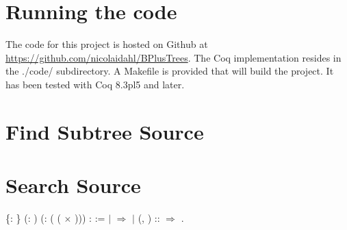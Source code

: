 \appendix
\label{sec:Appendix}
\section{Running the code}
The code for this project is hosted on Github at \url{https://github.com/nicolaidahl/BPlusTrees}. The Coq implementation resides in the ./code/ subdirectory. A Makefile is provided that will build the project. It has been tested with Coq 8.3pl5 and later.

\newpage

\section{Find Subtree Source}
\label{sec:findSubtree}


\section{Search Source}
\label{sec:SearchSource}

\begin{coqdoccode}
  \{: \} (: ) (: ( ( \ensuremath{\times} ))) :   :=\coqdoceol
\coqdocindent{1.00em}
  \coqdoceol
\coqdocindent{2.00em}
\ensuremath{|}  \ensuremath{\Rightarrow} \coqdoceol
\coqdocindent{2.00em}
\ensuremath{|} (, ) ::  \ensuremath{\Rightarrow}           \coqdoceol
\coqdocindent{1.00em}
.\coqdoceol
\coqdocemptyline
\coqdocnoindent
\end{coqdoccode}



